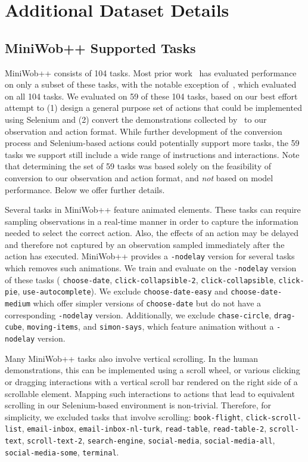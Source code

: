 
\newpage

\section{Additional Dataset Details}
\label{sec:appendix-a}
\subsection{MiniWob++ Supported Tasks}

MiniWob++ consists of 104 tasks. Most prior work~\citep{shi2017world, liu2018reinforcement, gur2018learning, jia2019dom} has evaluated performance on only a subset of these tasks, with the notable exception of~\citet{humphreys2022data}, which evaluated on all 104 tasks. We evaluated on 59 of these 104 tasks, based on our best effort attempt to (1) design a general purpose set of actions that could be implemented using Selenium and (2) convert the demonstrations collected by~\citet{humphreys2022data} to our observation and action format. While further development of the conversion process and Selenium-based actions could potentially support more tasks, the 59 tasks we support still include a wide range of instructions and interactions. Note that determining the set of 59 tasks was based solely on the feasibility of conversion to our observation and action format, and \emph{not} based on model performance. Below we offer further details. 

Several tasks in MiniWob++ feature animated elements. These tasks can require sampling observations in a real-time manner in order to capture the information needed to select the correct action. Also, the effects of an action may be delayed and therefore not captured by an observation sampled immediately after the action has executed. MiniWob++ provides a \texttt{-nodelay} version for several tasks which removes such animations. We train and evaluate on the \texttt{-nodelay} version of these tasks (%
\texttt{choose-date},
\texttt{click-collapsible-2},
\texttt{click-collapsible},
\texttt{click-pie},
\texttt{use-autocomplete}). We exclude \texttt{choose-date-easy} and \texttt{choose-date-medium} which offer simpler versions of \texttt{choose-date} but do not have a corresponding \texttt{-nodelay} version. Additionally, we exclude \texttt{chase-circle}, \texttt{drag-cube}, \texttt{moving-items}, and \texttt{simon-says}, which feature animation without a \texttt{-nodelay} version.

Many MiniWob++ tasks also involve vertical scrolling. In the human demonstrations, this can be implemented using a scroll wheel, or various clicking or dragging interactions with a vertical scroll bar rendered on the right side of a scrollable element. Mapping such interactions to actions that lead to equivalent scrolling in our Selenium-based environment is non-trivial. 
Therefore, for simplicity, we excluded tasks that involve scrolling: \texttt{book-flight},
\texttt{click-scroll-list},
\texttt{email-inbox},
\texttt{email-inbox-nl-turk},
\texttt{read-table},
\texttt{read-table-2},
\texttt{scroll-text},
\texttt{scroll-text-2},
\texttt{search-engine},
\texttt{social-media},
\texttt{social-media-all},
\texttt{social-media-some},
\texttt{terminal}.

